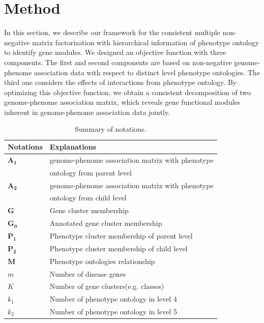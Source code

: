 \documentclass{bmcart}
\begin{document}

\section*{Method}
In this section, we describe our framework for the consistent multiple non-negative matrix
factorization with hierarchical information of phenotype ontology to identify gene modules.
We designed an objective function with three components. The first and second components are based on non-negative genome-phenome association data with respect to distinct level phenotype ontologies. The third one considers the effects of interactions from phenotype ontology. By optimizing this objective function, we obtain a consistent decomposition of two genome-phenome association matrix, which reveals gene functional modules inherent in genome-phenome association data jointly.
\begin{table}[t!]
 \caption{Summary of notations.}\label{Tab:Notations}
\begin{tabular}{|l|l|}
    \hline
    Notations & Explanations\\
    \hline\hline
    $\bm{A_1}$ & genome-phenome association matrix with phenotype\\
    & ontology from parent level\\
    $\bm{A_2}$ & genome-phenome association matrix with phenotype\\
    & ontology from child level\\
    $\bm{G}$ & Gene cluster membership\\
    $\bm{G_0}$ & Annotated gene cluster membership\\
    $\bm{P_1}$ & Phenotype cluster membership of parent level\\
    $\bm{P_2}$ & Phenotype cluster membership of child level\\
    $\bm{M}$ & Phenotype ontologies relationship\\
    $m$ & Number of disease genes\\
    $K$ & Number of gene clusters(e.g. classes)\\
    $k_1$ & Number of phenotype ontology in level 4\\
    $k_2$ & Number of phenotype ontology in level 5\\
    \hline
  \end{tabular}
\end{table}
\end{document}
